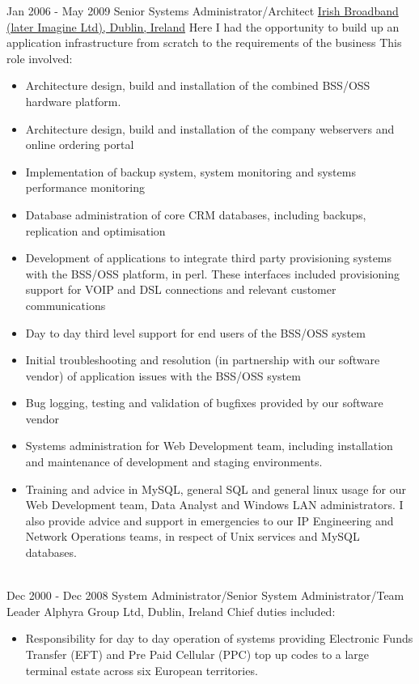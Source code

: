 \documentclass[letterpaper]{tenseconds} %
\begin{document}
\begin{twenty} %
	\twentyitem
	{Jan 2006 -}
	{May 2009}
	{Senior Systems Administrator/Architect}
	{\href{https://www.imagine.ie/}{Irish Broadband (later Imagine Ltd), Dublin, Ireland}}
	{Here I had the opportunity to build up an application infrastructure from scratch to the requirements of the business This role involved:}
	{\begin{itemize}
		\item Architecture design, build and installation of the combined BSS/OSS hardware platform.
		\item Architecture design, build and installation of the company webservers and online ordering portal
		\item Implementation of backup system, system monitoring and systems performance monitoring
		\item Database administration of core CRM databases, including backups, replication and optimisation
		\item Development of applications to integrate third party provisioning systems with the BSS/OSS platform, in perl. These interfaces included provisioning support for VOIP and DSL connections and relevant customer communications
		\item Day to day third level support for end users of the BSS/OSS system
		\item Initial troubleshooting and resolution (in partnership with our software vendor) of application issues with the BSS/OSS system
		\item Bug logging, testing and validation of bugfixes provided by our software vendor
		\item Systems administration for Web Development team, including installation and maintenance of development and staging environments.
		\item Training and advice in MySQL, general SQL and general linux usage for our Web Development team, Data Analyst and Windows LAN administrators. I also provide advice and support in emergencies to our IP Engineering and Network Operations teams, in respect of Unix services and MySQL databases.
		\end{itemize}}
	\\
	\twentyitem
	{Dec 2000 -}
	{Dec 2008}
	{System Administrator/Senior System Administrator/Team Leader}
	{Alphyra Group Ltd, Dublin, Ireland}
	{Chief duties included:}
	{\begin{itemize}
		\item Responsibility for day to day operation of systems providing Electronic Funds Transfer (EFT) and Pre Paid Cellular (PPC) top up codes to a large terminal estate across six European territories.

\end{itemize}}
\end{twenty}
\end{document}

